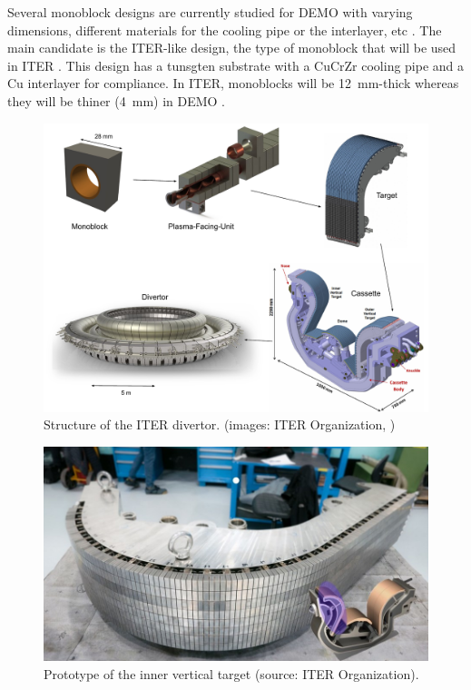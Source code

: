 Several monoblock designs are currently studied for DEMO with varying dimensions, different materials for the cooling pipe or the interlayer, etc .
The main candidate is the ITER-like design, the type of monoblock that will be used in ITER \cite{hirai_use_2016}.
This design has a tunsgten substrate with a CuCrZr cooling pipe and a Cu interlayer for compliance.
In ITER, monoblocks will be \SI{12}{mm}-thick whereas they will be thiner (\SI{4}{mm}) in DEMO .

\begin{figure}
    \includegraphics[width=\linewidth]{Figures/Chapter1/monoblock_to_divertor.pdf}
    \caption{Structure of the ITER divertor. (images: ITER Organization, \cite{guerrini_fabrication_2021}) }
\end{figure}

\begin{figure} [h]
    \centering
    \includegraphics[width=0.8\linewidth]{Figures/Chapter1/inner_target_iter.jpg}
    \caption{Prototype of the inner vertical target (source: ITER Organization).}
\end{figure}

